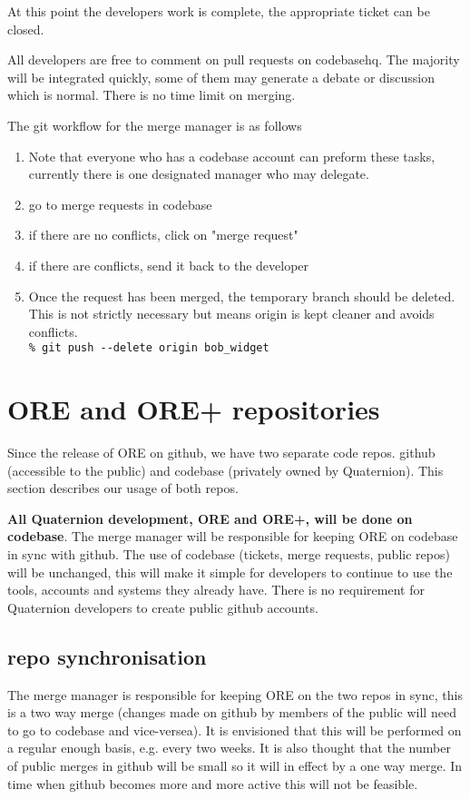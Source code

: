 \documentclass[12pt, a4paper]{article}
\begin{document}
At this point the developers work is complete, the appropriate ticket can be closed.

All developers are free to comment on pull requests on codebasehq. The majority will be integrated quickly, some of them may generate a debate or discussion which is normal. There is no time limit on merging.


The git workflow for the merge manager is as follows
\begin{enumerate}
\item Note that everyone who has a codebase account can preform these tasks, currently there is one designated manager who may delegate.
\item go to merge requests in codebase
\item if there are no conflicts, click on "merge request"
\item if there are conflicts, send it back to the developer
\item Once the request has been merged, the temporary branch should be deleted. This is not strictly necessary but means origin is kept cleaner and avoids conflicts.\\
 \texttt{\% git push -{}-delete origin bob\_widget}
\end{enumerate}

\break
\section*{ORE and ORE+ repositories}
Since the release of ORE on github, we have two separate code repos. github (accessible to the public) and codebase (privately owned by Quaternion). This section describes our usage of both repos.

\textbf{All Quaternion development, ORE and ORE+, will be done on codebase}. The merge manager will be responsible for keeping ORE on codebase in sync with github. The use of codebase (tickets, merge requests, public repos) will be unchanged, this will make it simple for developers to continue to use the tools, accounts and systems they already have. There is no requirement for Quaternion developers to create public github accounts.

\subsection*{repo synchronisation}
The merge manager is responsible for keeping ORE on the two repos in sync, this is a two way merge (changes made on github by members of the public will need to go to codebase and vice-versea). It is envisioned that this will be performed on a regular enough basis, e.g. every two weeks. It is also thought that the number of public merges in github will be small so it will in effect by a one way merge. In time when github becomes more and more active this will not be feasible.
\end{document}
